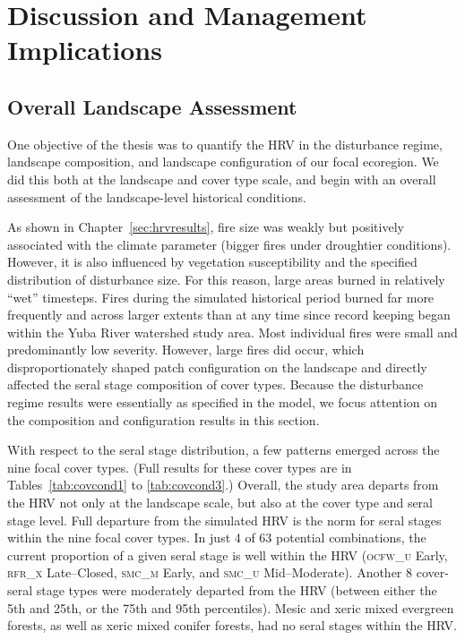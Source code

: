 
\section{Discussion and Management Implications}
\label{sec:hrvdiscussion}






\subsection{Overall Landscape Assessment}

One objective of the thesis was to quantify the HRV in the disturbance regime, landscape composition, and landscape configuration of our focal ecoregion. We did this both at the landscape and cover type scale, and begin with an overall assessment of the landscape-level historical conditions.

As shown in Chapter~\ref{sec:hrvresults}, fire size was weakly but positively associated with the climate parameter (bigger fires under droughtier conditions). However, it is also influenced by vegetation susceptibility and the specified distribution of disturbance size. For this reason, large areas burned in relatively ``wet'' timesteps. Fires during the simulated historical period burned far more frequently and across larger extents than at any time since record keeping began within the Yuba River watershed study area. Most individual fires were small and predominantly low severity. However, large fires did occur, which disproportionately shaped patch configuration on the landscape and directly affected the seral stage composition of cover types. Because the disturbance regime results were essentially as specified in the model, we focus attention on the composition and configuration results in this section.

With respect to the seral stage distribution, a few patterns emerged across the nine focal cover types. (Full results for these cover types are in Tables~\ref{tab:covcond1} to \ref{tab:covcond3}.) Overall, the study area departs from the HRV not only at the landscape scale, but also at the cover type and seral stage level. Full departure from the simulated HRV is the norm for seral stages within the nine focal cover types. In just 4 of 63 potential combinations, the current proportion of a given seral stage is well within the HRV (\textsc{ocfw\_u} Early, \textsc{rfr\_x} Late--Closed, \textsc{smc\_m} Early, and \textsc{smc\_u} Mid--Moderate). Another 8 cover-seral stage types were moderately departed from the HRV (between either the 5th and 25th, or the 75th and 95th percentiles). Mesic and xeric mixed evergreen forests, as well as xeric mixed conifer forests, had no seral stages within the HRV.

